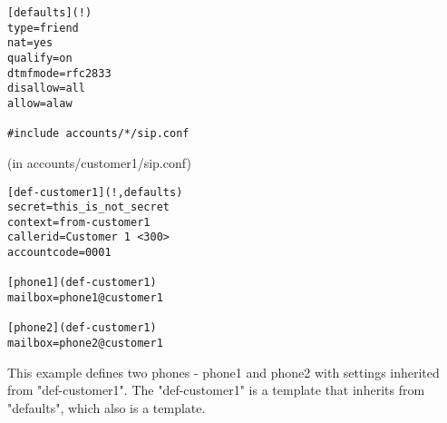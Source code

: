 \begin{verbatim}
[defaults](!)
type=friend
nat=yes
qualify=on
dtmfmode=rfc2833
disallow=all
allow=alaw

#include accounts/*/sip.conf
\end{verbatim}

(in accounts/customer1/sip.conf)

\begin{verbatim}
[def-customer1](!,defaults)
secret=this_is_not_secret
context=from-customer1
callerid=Customer 1 <300>
accountcode=0001

[phone1](def-customer1)
mailbox=phone1@customer1

[phone2](def-customer1)
mailbox=phone2@customer1
\end{verbatim}

This example defines two phones - phone1 and phone2 with settings
inherited from "def-customer1".  The "def-customer1" is a template that
inherits from "defaults", which also is a template.
